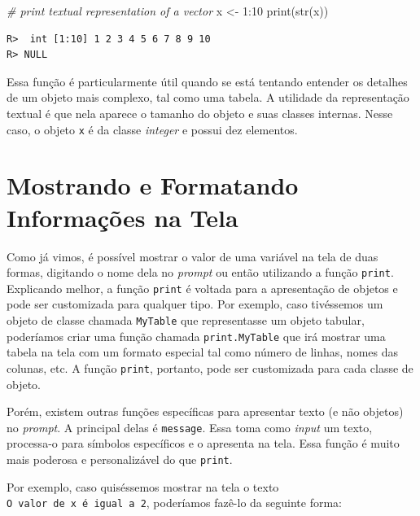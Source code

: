 \documentclass[
  11pt,
]{book}
\newenvironment{Shaded}{\begin{snugshade}}{\end{snugshade}}
\newcommand{\CommentTok}[1]{\textcolor[rgb]{0.37,0.37,0.37}{\textit{#1}}}
\newcommand{\DecValTok}[1]{\textcolor[rgb]{0.06,0.06,0.06}{#1}}
\newcommand{\FunctionTok}[1]{\textcolor[rgb]{0,0,0}{#1}}
\newcommand{\NormalTok}[1]{#1}
\newcommand{\OtherTok}[1]{\textcolor[rgb]{0.37,0.37,0.37}{#1}}
\newcommand{\SpecialCharTok}[1]{\textcolor[rgb]{0,0,0}{#1}}
\begin{document}
\begin{Shaded}
\begin{Highlighting}[]
\CommentTok{\# print textual representation of a vector}
\NormalTok{x }\OtherTok{\textless{}{-}} \DecValTok{1}\SpecialCharTok{:}\DecValTok{10}
\FunctionTok{print}\NormalTok{(}\FunctionTok{str}\NormalTok{(x))}
\end{Highlighting}
\end{Shaded}

\begin{verbatim}
R>  int [1:10] 1 2 3 4 5 6 7 8 9 10
R> NULL
\end{verbatim}

Essa função é particularmente útil quando se está tentando entender os detalhes de um objeto mais complexo, tal como uma tabela. A utilidade da representação textual é que nela aparece o tamanho do objeto e suas classes internas. Nesse caso, o objeto \texttt{x} é da classe \emph{integer} e possui dez elementos.

\hypertarget{mostrando-e-formatando-informauxe7uxf5es-na-tela}{%
\section{Mostrando e Formatando Informações na Tela}\label{mostrando-e-formatando-informauxe7uxf5es-na-tela}}

Como já vimos, é possível mostrar o valor de uma variável na tela de duas formas, digitando o nome dela no \emph{prompt} ou então utilizando a função \texttt{print}. Explicando melhor, a função \texttt{print} é voltada para a apresentação de objetos e pode ser customizada para qualquer tipo. Por exemplo, caso tivéssemos um objeto de classe chamada \texttt{MyTable} que representasse um objeto tabular, poderíamos criar uma função chamada \texttt{print.MyTable} que irá mostrar uma tabela na tela com um formato especial tal como número de linhas, nomes das colunas, etc. A função \texttt{print}, portanto, pode ser customizada para cada classe de objeto.

Porém, existem outras funções específicas para apresentar texto (e não objetos) no \emph{prompt}. A principal delas é \texttt{message}. Essa toma como \emph{input} um texto, processa-o para símbolos específicos e o apresenta na tela. Essa função é muito mais poderosa e personalizável do que \texttt{print}. 

Por exemplo, caso quiséssemos mostrar na tela o texto \texttt{\textquotesingle{}O\ valor\ de\ x\ é\ igual\ a\ 2\textquotesingle{}}, poderíamos fazê-lo da seguinte forma:
\end{document}

